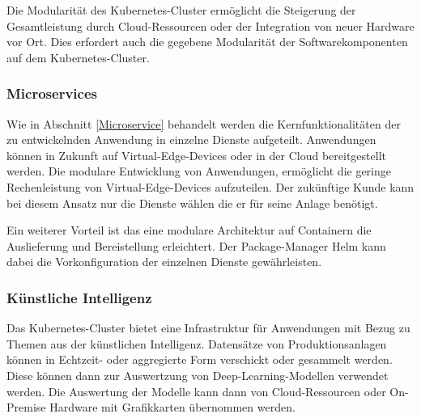 Die Modularität des Kubernetes-Cluster ermöglicht die Steigerung der Gesamtleistung durch Cloud-Ressourcen oder der Integration von neuer Hardware vor Ort.
Dies erfordert auch die gegebene Modularität der Softwarekomponenten auf dem Kubernetes-Cluster.

\subsubsection{Microservices}
Wie in Abschnitt \ref{Microservice} behandelt werden die Kernfunktionalitäten der zu entwickelnden Anwendung in einzelne Dienste aufgeteilt.
Anwendungen können in Zukunft auf Virtual-Edge-Devices oder in der Cloud bereitgestellt werden.
Die modulare Entwicklung von Anwendungen, ermöglicht die geringe Rechenleistung von Virtual-Edge-Devices aufzuteilen.
Der zukünftige Kunde kann bei diesem Ansatz nur die Dienste wählen die er für seine Anlage benötigt.

Ein weiterer Vorteil ist das eine modulare Architektur auf Containern die Auslieferung und Bereistellung erleichtert.
Der Package-Manager Helm kann dabei die Vorkonfiguration der einzelnen Dienste gewährleisten.


\subsubsection{Künstliche Intelligenz}
Das Kubernetes-Cluster bietet eine Infrastruktur für Anwendungen mit Bezug zu Themen aus der künstlichen Intelligenz.
Datensätze von Produktionsanlagen können in Echtzeit- oder aggregierte Form verschickt oder gesammelt werden.
Diese können dann zur Auswertzung von Deep-Learning-Modellen verwendet werden.
Die Auswertung der Modelle kann dann von Cloud-Ressourcen oder On-Premise Hardware mit Grafikkarten übernommen werden. 




